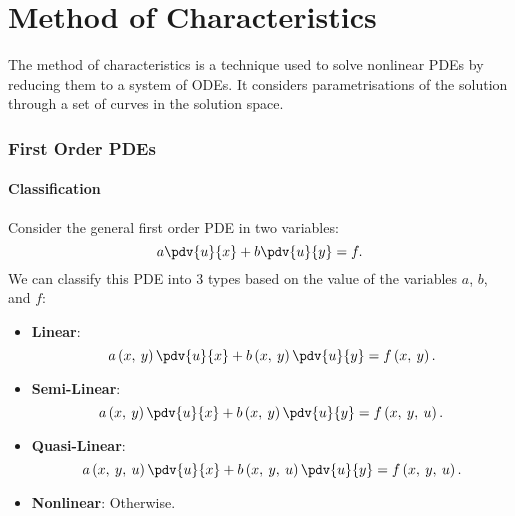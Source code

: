 \documentclass{article}
\theoremstyle{definition}
\begin{document}
\part{Method of Characteristics}
The method of characteristics is a technique used to solve nonlinear
PDEs by reducing them to a system of ODEs. It considers
parametrisations of the solution through a set of curves in the
solution space.
\section{First Order PDEs}
\subsection{Classification}
Consider the general first order PDE in two variables:
\begin{equation*}
    a \pdv{u}{x} + b \pdv{u}{y} = f.
\end{equation*}
We can classify this PDE into 3 types based on the value of the
variables \(a\), \(b\), and \(f\):
\begin{itemize}
    \item \textbf{Linear}:
          \begin{equation*}
              a\left( x,\: y \right) \pdv{u}{x} + b\left( x,\: y \right) \pdv{u}{y} = f\left( x,\: y \right).
          \end{equation*}
    \item \textbf{Semi-Linear}:
    \begin{equation*}
        a\left( x,\: y \right) \pdv{u}{x} + b\left( x,\: y \right) \pdv{u}{y} = f\left( x,\: y,\: u \right).
    \end{equation*}
    \item \textbf{Quasi-Linear}:
    \begin{equation*}
        a\left( x,\: y,\: u \right) \pdv{u}{x} + b\left( x,\: y,\: u \right) \pdv{u}{y} = f\left( x,\: y,\: u \right).
    \end{equation*}
    \item \textbf{Nonlinear}: Otherwise.
\end{itemize}
\end{document}
